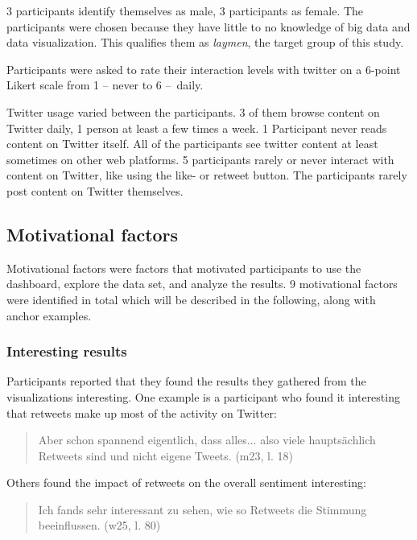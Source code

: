 
3 participants identify themselves as male, 3 participants as female. The participants were chosen because they have little to no knowledge of big data and data visualization. This qualifies them as \emph{laymen}, the target group of this study.

Participants were asked to rate their interaction levels with twitter on a 6-point Likert scale from 1 – never to 6 – daily.

Twitter usage varied between the participants. 3 of them browse content on Twitter daily, 1 person at least a few times a week. 1 Participant never reads content on Twitter itself. All of the participants see twitter content at least sometimes on other web platforms. 5 participants rarely or never interact with content on Twitter, like using the like- or retweet button. The participants rarely post content on Twitter themselves.

\subsection{Motivational factors}
Motivational factors were factors that motivated participants to use the dashboard, explore the data set, and analyze the results. 9 motivational factors were identified in total which will be described in the following, along with anchor examples.

\subsubsection*{Interesting results}
Participants reported that they found the results they gathered from the visualizations interesting. One example is a participant who found it interesting that retweets make up most of the activity on Twitter:

\begin{quote}
    Aber schon spannend eigentlich, dass alles... also viele hauptsächlich Retweets sind und nicht eigene Tweets. (m23, l. 18)
\end{quote}

Others found the impact of retweets on the overall sentiment interesting:

\begin{quote}
    Ich fands sehr interessant zu sehen, wie so Retweets die Stimmung beeinflussen. (w25, l. 80)
\end{quote}


